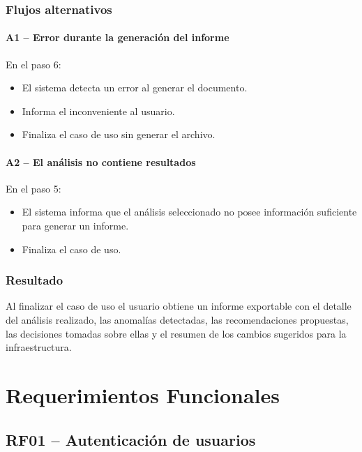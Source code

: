 \subsubsection*{Flujos alternativos}

\paragraph{A1 -- Error durante la generación del informe}

En el paso 6:

\begin{itemize}
\item El sistema detecta un error al generar el documento.
\item Informa el inconveniente al usuario.
\item Finaliza el caso de uso sin generar el archivo.
\end{itemize}

\paragraph{A2 -- El análisis no contiene resultados}

En el paso 5:

\begin{itemize}
\item El sistema informa que el análisis seleccionado no posee información suficiente para generar un informe.
\item Finaliza el caso de uso.
\end{itemize}

\subsubsection*{Resultado}

Al finalizar el caso de uso el usuario obtiene un informe exportable con el detalle del análisis realizado, las anomalías detectadas, las recomendaciones propuestas, las decisiones tomadas sobre ellas y el resumen de los cambios sugeridos para la infraestructura.

\section{Requerimientos Funcionales}

\subsection{RF01 -- Autenticación de usuarios}

